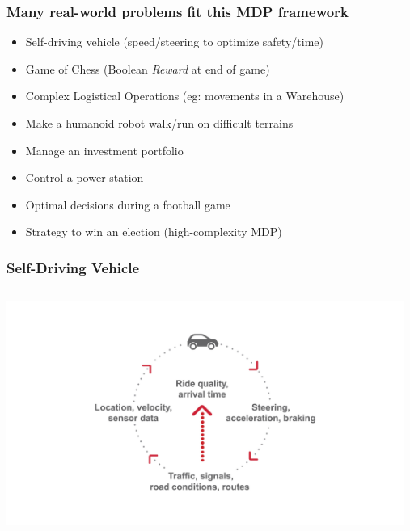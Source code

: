 \documentclass[handout]{beamer}
\begin{document}
\begin{frame}
\frametitle{Many real-world problems fit this MDP framework}
\pause
\begin{itemize}[<+->]
\item Self-driving vehicle (speed/steering to optimize safety/time)
\item Game of Chess (Boolean {\em Reward} at end of game)
\item Complex Logistical Operations (eg: movements in a Warehouse)
\item Make a humanoid robot walk/run on difficult terrains
\item Manage an investment portfolio
\item Control a power station
\item Optimal decisions during a football game
\item Strategy to win an election (high-complexity MDP)
\end{itemize}
\end{frame}

\begin{frame}
\frametitle{Self-Driving Vehicle}
\includegraphics[width=13cm, height=8cm]{CarMDP.jpg}
\end{frame}
\end{document}
